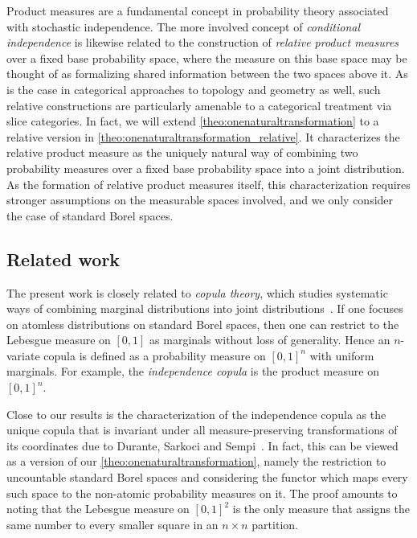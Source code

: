 \documentclass[11pt,a4paper]{scrartcl}
\theoremstyle{definition}
\begin{document}
Product measures are a fundamental concept in probability theory associated with stochastic independence.
The more involved concept of \emph{conditional independence} is likewise related to the construction of \emph{relative product measures} over a fixed base probability space,
where the measure on this base space may be thought of as formalizing shared information between the two spaces above it.
As is the case in categorical approaches to topology and geometry as well, such relative constructions are particularly amenable to a categorical treatment via slice categories.
In fact, we will extend \cref{theo:onenaturaltransformation} to a relative version in \cref{theo:onenaturaltransformation_relative}.
It characterizes the relative product measure as the uniquely natural way of combining two probability measures over a fixed base probability space into a joint distribution.
As the formation of relative product measures itself, this characterization requires stronger assumptions on the measurable spaces involved, and we only consider the case of standard Borel spaces.

\subsection*{Related work}

The present work is closely related to \emph{copula theory},
which studies systematic ways of combining marginal distributions into joint distributions~\cite{Nelsen2006,Durante2007,Durante2009}.
If one focuses on atomless distributions on standard Borel spaces,
then one can restrict to the Lebesgue measure on $[0,1]$ as marginals without loss of generality.
Hence an $n$-variate copula is defined as a probability measure on $[0,1]^n$ with uniform marginals.
For example, the \emph{independence copula} is the product measure on $[0,1]^n$.

Close to our results is the characterization of the independence copula as the unique copula that is invariant under all measure-preserving transformations of its coordinates due to Durante, Sarkoci and Sempi~\cite[Theorem~3.1]{Durante2009}.
In fact, this can be viewed as a version of our \cref{theo:onenaturaltransformation},
namely the restriction to uncountable standard Borel spaces and considering the functor which maps every such space to the non-atomic probability measures on it.
The proof amounts to noting that the Lebesgue measure on $[0,1]^2$ is the only measure that assigns the same number to every smaller square in an $n \times n$ partition.
\end{document}
